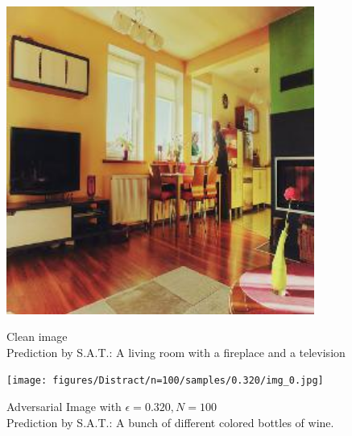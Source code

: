 \begin{figure}[ht]
    \centering
    \begin{minipage}{0.45\textwidth}
        \centering
        \includegraphics[width=0.9\textwidth]{figures/Distract/n=100/samples/0.000/img_0.jpg} %
        \caption*{Clean image\\Prediction by S.A.T.: A living room with a fireplace and a television}
    \end{minipage}\hfill
    \begin{minipage}{0.45\textwidth}
        \centering
        \texttt{[image: figures/Distract/n=100/samples/0.320/img\_0.jpg]} %
        \caption*{Adversarial Image with $\epsilon=0.320, N=100$\\Prediction by S.A.T.: A bunch of different colored bottles of wine.}
    \end{minipage}
\end{figure}


